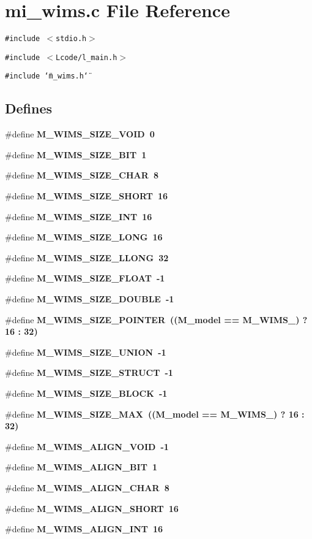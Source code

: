 \section{mi\_\-wims.c File Reference}
\label{mi__wims_8c}
{\tt \#include $<$stdio.h$>$}\par
{\tt \#include $<$Lcode/l\_\-main.h$>$}\par
{\tt \#include \char`\"{}m\_\-wims.h\char`\"{}}\par
\subsection*{Defines}
\begin{CompactItemize}
\item 
\#define \bf{M\_\-WIMS\_\-SIZE\_\-VOID}~0
\item 
\#define \bf{M\_\-WIMS\_\-SIZE\_\-BIT}~1
\item 
\#define \bf{M\_\-WIMS\_\-SIZE\_\-CHAR}~8
\item 
\#define \bf{M\_\-WIMS\_\-SIZE\_\-SHORT}~16
\item 
\#define \bf{M\_\-WIMS\_\-SIZE\_\-INT}~16
\item 
\#define \bf{M\_\-WIMS\_\-SIZE\_\-LONG}~16
\item 
\#define \bf{M\_\-WIMS\_\-SIZE\_\-LLONG}~32
\item 
\#define \bf{M\_\-WIMS\_\-SIZE\_\-FLOAT}~-1
\item 
\#define \bf{M\_\-WIMS\_\-SIZE\_\-DOUBLE}~-1
\item 
\#define \bf{M\_\-WIMS\_\-SIZE\_\-POINTER}~((\bf{M\_\-model} == M\_\-WIMS\_) ? 16 : 32)
\item 
\#define \bf{M\_\-WIMS\_\-SIZE\_\-UNION}~-1
\item 
\#define \bf{M\_\-WIMS\_\-SIZE\_\-STRUCT}~-1
\item 
\#define \bf{M\_\-WIMS\_\-SIZE\_\-BLOCK}~-1
\item 
\#define \bf{M\_\-WIMS\_\-SIZE\_\-MAX}~((\bf{M\_\-model} == M\_\-WIMS\_) ? 16 : 32)
\item 
\#define \bf{M\_\-WIMS\_\-ALIGN\_\-VOID}~-1
\item 
\#define \bf{M\_\-WIMS\_\-ALIGN\_\-BIT}~1
\item 
\#define \bf{M\_\-WIMS\_\-ALIGN\_\-CHAR}~8
\item 
\#define \bf{M\_\-WIMS\_\-ALIGN\_\-SHORT}~16
\item 
\#define \bf{M\_\-WIMS\_\-ALIGN\_\-INT}~16
\item 

\end{CompactItemize}
